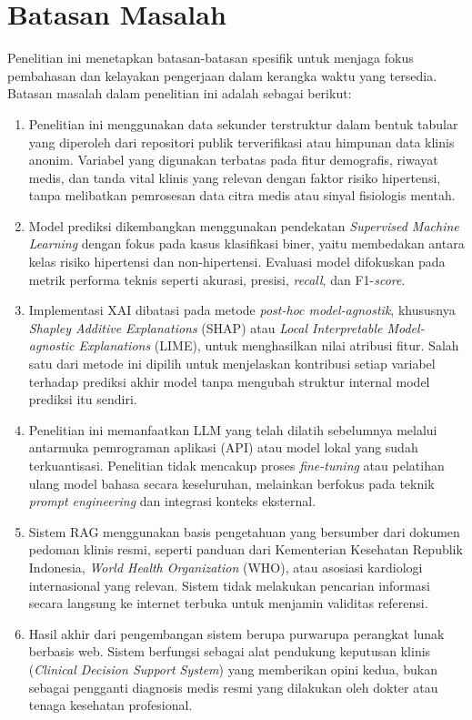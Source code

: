 \section{Batasan Masalah}
Penelitian ini menetapkan batasan-batasan spesifik untuk menjaga fokus pembahasan dan kelayakan pengerjaan dalam kerangka waktu yang tersedia. Batasan masalah dalam penelitian ini adalah sebagai berikut:
\begin{enumerate}
    \item Penelitian ini menggunakan data sekunder terstruktur dalam bentuk tabular yang diperoleh dari repositori publik terverifikasi atau himpunan data klinis anonim. Variabel yang digunakan terbatas pada fitur demografis, riwayat medis, dan tanda vital klinis yang relevan dengan faktor risiko hipertensi, tanpa melibatkan pemrosesan data citra medis atau sinyal fisiologis mentah.
    \item Model prediksi dikembangkan menggunakan pendekatan \textit{Supervised Machine Learning} dengan fokus pada kasus klasifikasi biner, yaitu membedakan antara kelas risiko hipertensi dan non-hipertensi. Evaluasi model difokuskan pada metrik performa teknis seperti akurasi, presisi, \textit{recall}, dan F1-\textit{score}.
    \item Implementasi XAI dibatasi pada metode \textit{post-hoc model-agnostik}, khususnya \textit{Shapley Additive Explanations} (SHAP) atau \textit{Local Interpretable Model-agnostic Explanations} (LIME), untuk menghasilkan nilai atribusi fitur. Salah satu dari metode ini dipilih untuk menjelaskan kontribusi setiap variabel terhadap prediksi akhir model tanpa mengubah struktur internal model prediksi itu sendiri.
    \item Penelitian ini memanfaatkan LLM yang telah dilatih sebelumnya melalui antarmuka pemrograman aplikasi (API) atau model lokal yang sudah terkuantisasi. Penelitian tidak mencakup proses \textit{fine-tuning} atau pelatihan ulang model bahasa secara keseluruhan, melainkan berfokus pada teknik \textit{prompt engineering} dan integrasi konteks eksternal.
    \item Sistem RAG menggunakan basis pengetahuan yang bersumber dari dokumen pedoman klinis resmi, seperti panduan dari Kementerian Kesehatan Republik Indonesia, \textit{World Health Organization} (WHO), atau asosiasi kardiologi internasional yang relevan. Sistem tidak melakukan pencarian informasi secara langsung ke internet terbuka untuk menjamin validitas referensi.
    \item Hasil akhir dari pengembangan sistem berupa purwarupa perangkat lunak berbasis web. Sistem berfungsi sebagai alat pendukung keputusan klinis (\textit{Clinical Decision Support System}) yang memberikan opini kedua, bukan sebagai pengganti diagnosis medis resmi yang dilakukan oleh dokter atau tenaga kesehatan profesional.
\end{enumerate}

